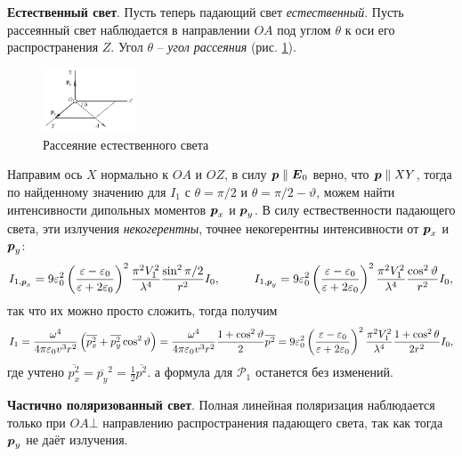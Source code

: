 \textbf{Естественный свет}. 
Пусть теперь падающий свет \textit{естественный}. Пусть рассеянный свет наблюдается в направлении $OA$ под углом $\theta$ к оси его распространения $Z$. Угол $\theta$ -- \textit{угол рассеяния} (рис. \ref{fig:freaky}). 
\begin{figure}[h]
    \centering
    \includegraphics[width=0.25\textwidth]{figures/95_1.png}
    \caption{Рассеяние естественного света}
    \label{fig:freaky}
\end{figure}
Направим ось $X$ нормально к $OA$ и $OZ$, в силу $\mbox{\boldmath $p$} \parallel \mbox{\boldmath $E$}_0$ верно, что $\mbox{\boldmath $p$} \parallel XY$, тогда по найденному значению для $I_1$ с $\theta = \pi/2$ и $\theta = \pi/2- \vartheta$, можем найти интенсивности дипольных моментов $\mbox{\boldmath $p$}_x$ и $\mbox{\boldmath $p$}_y$. В силу ествественности падающего света, эти излучения \textit{некогерентны}, точнее некогерентны интенсивности от $\mbox{\boldmath $p$}_x$ и $\mbox{\boldmath $p$}_y$:
\begin{equation*}
    I_{1, \smallvc{p}_x} = 9 \varepsilon_0^2 \left(
        \frac{\varepsilon-\varepsilon_0}{\varepsilon+2 \varepsilon_0}
    \right)^2 \frac{\pi^2 V_1^2}{\lambda^4} \frac{\sin^2 \pi/2}{r^2} I_0,
    \hspace{10 mm} 
    I_{1, \smallvc{p}_y} = 9 \varepsilon_0^2 \left(
        \frac{\varepsilon-\varepsilon_0}{\varepsilon+2 \varepsilon_0}
    \right)^2 \frac{\pi^2 V_1^2}{\lambda^4} \frac{\cos^2 \vartheta}{r^2} I_0,
\end{equation*}
так что их можно просто сложить, тогда получим
\begin{equation*}
     I_1 
     =
    \frac{\omega^4}{4 \pi \varepsilon_0 v^3 r^2} \left(
        \overline{p_x^2} + \overline{p_y^2} \cos^2 \vartheta
     \right) 
     = 
     \frac{\omega^4}{4 \pi \varepsilon_0 v^3 r^2} \frac{1+\cos^2 \vartheta}{2} \overline{p^2} 
     =
     9 \varepsilon_0^2 \left(\frac{\varepsilon-\varepsilon_0}{\varepsilon+2 \varepsilon_0}\right)^2 \frac{\pi^2 V_1^2}{\lambda^4} \frac{1+\cos^2 \theta}{2 r^2} I_0,
 \end{equation*} 
 где учтено $\overline{p_x^2} = \overline{p_y}^2 = \frac{1}{2} \overline{p^2}$. 
 а формула для $\mathcal P_1$ останется без изменений. 




\textbf{Частично поляризованный свет}. Полная линейная поляризация наблюдается только при $OA \bot $ направлению распространения падающего света, так как тогда $\mbox{\boldmath $p$}_y$ не даёт излучения. 


